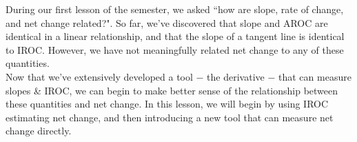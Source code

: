 \documentclass[10pt]{article}
\begin{document}
\pagestyle{otherpages}
\thispagestyle{firstpage}

During our first lesson of the semester, we asked ``how are slope, rate of change, and net change related?". So far, we've discovered that slope and AROC are identical in a linear relationship, and that the slope of a tangent line is identical to IROC. However, we have not meaningfully related net change to any of these quantities.\\

Now that we've extensively developed a tool $-$ the derivative $-$ that can measure slopes \& IROC, we can begin to make better sense of the relationship between these quantities and net change. In this lesson, we will begin by using IROC estimating net change, and then introducing a new tool that can measure net change directly.\\
\end{document}
